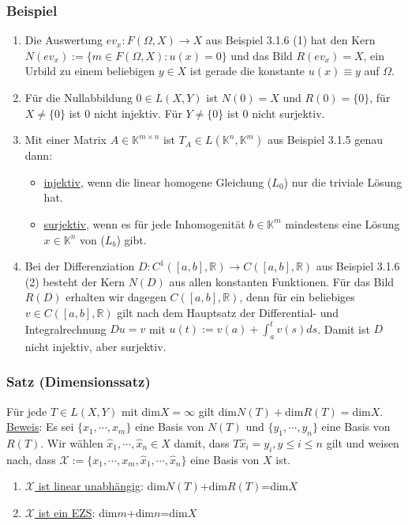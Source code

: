 \subsubsection{Beispiel}
\renewcommand{\labelenumi}{(\arabic{enumi})}
\begin{enumerate}
\item Die Auswertung $ev_x:F(\Omega ,X)\rightarrow X$ aus Beispiel 3.1.6 (1) hat den Kern $N(ev_x):=\{m\in F(\Omega ,X):u(x)=0\}$ und das Bild $R(ev_x)=X$, ein Urbild zu einem beliebigen $y\in X$ ist gerade die konstante $u(x)\equiv y$ auf $\Omega$.
\item Für die Nullabbildung $0\in L(X,Y)$ ist $N(0)=X$ und $R(0)=\{0\}$, für $X\not= \{0\}$ ist $0$ nicht injektiv.  Für $Y\not= \{0\}$ ist $0$ nicht surjektiv.
\item Mit einer Matrix $A\in \mathbb{K}^{m\times n}$ ist $T_A\in L(\mathbb{K}^n,\mathbb{K}^m)$ aus Beispiel 3.1.5 genau dann:
\begin{itemize}
\item \underline{injektiv}, wenn die linear homogene Gleichung ($L_0$) nur die triviale Lösung hat.
\item \underline{surjektiv}, wenn es für jede Inhomogenität $b\in\mathbb{K}^m$ mindestens eine Lösung $x\in\mathbb{K}^n$ von ($L_b$) gibt.
\end{itemize}
\item Bei der Differenziation $D:C^1([a,b],\mathbb{R})\rightarrow C([a,b],\mathbb{R})$ aus Beispiel 3.1.6 (2) besteht der Kern $N(D)$ aus allen konstanten Funktionen.  Für das Bild $R(D)$ erhalten wir dagegen $C([a,b],\mathbb{R})$, denn für ein beliebiges $v\in C([a,b],\mathbb{R})$ gilt nach dem Hauptsatz der Differential- und Integralrechnung $Du=v$ mit $u(t):=v(a)+\int_a^t v(s)ds$.  Damit ist $D$ nicht injektiv, aber surjektiv.
\end{enumerate}
\subsubsection{Satz (Dimensionssatz)}
Für jede $T\in L(X,Y)$ mit dim$X=\infty$ gilt dim$N(T)+$dim$R(T)=$dim$X$.\\
\underline{Beweis}: Es sei $\{x_1,\cdots ,x_m\}$ eine Basis von $N(T)$ und $\{y_1,\cdots ,y_n\}$ eine Basis von $R(T)$.  Wir wählen $\hat{x}_1,\cdots ,\hat{x}_n \in X$ damit, dass $T\hat{x}_i=y_i,y\leq i\leq n$ gilt und weisen nach, dass $\mathcal{X}:=\{x_1,\cdots ,x_m,\hat{x}_1,\cdots ,\hat{x}_n\}$ eine Basis von $X$ ist.
\renewcommand{\labelenumi}{(\roman{enumi})}
\begin{enumerate}
\item \underline{$\mathcal{X}$ ist linear unabhängig}: dim$N(T)$+dim$R(T)$=dim$X$
\item \underline{$\mathcal{X}$ ist ein EZS}: dim$m$+dim$n$=dim$X$
\end{enumerate}
